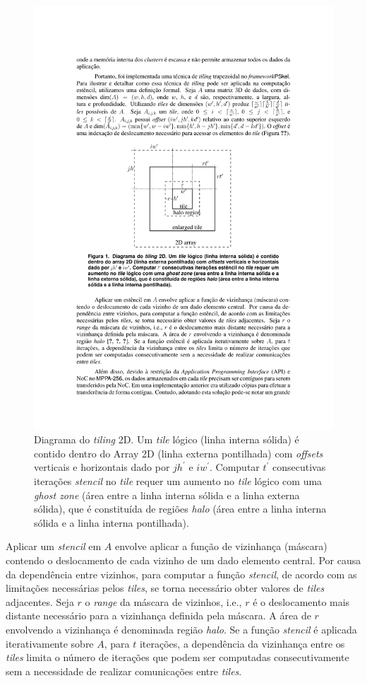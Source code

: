 \documentclass[12pt]{article}
\newcommand{\stencil}{\textit{stencil}\xspace}
\begin{document}
\begin{figure}[t]
\centering
\includegraphics[width=0.3\columnwidth]{figs/tile.pdf}
\caption{ Diagrama do \textit{tiling} 2D. Um \textit{tile} lógico (linha interna sólida) é contido dentro do Array
    2D (linha externa pontilhada) com \textit{offsets} verticais e horizontais dado por $j  h^\prime$
    e $i  w^\prime$. Computar $t^\prime$ consecutivas iterações \stencil no \textit{tile} requer um aumento no
    \textit{tile} lógico com uma \textit{ghost zone} (área entre a linha interna sólida e a linha externa sólida), que é constituída
    de regiões \textit{halo} (área entre a linha interna sólida e a linha interna pontilhada).}
\label{fig:gputile}
\end{figure}

Aplicar um \stencil em $A$ envolve aplicar a função de vizinhança (máscara)
contendo o deslocamento de cada vizinho de um dado elemento central. Por causa
da dependência entre vizinhos, para computar a função \stencil, de acordo com as
limitações necessárias pelos \textit{tiles}, se torna necessário obter valores
de \textit{tiles} adjacentes. Seja $r$ o \textit{range} da máscara de vizinhos,
i.e., $r$ é o deslocamento mais distante necessário para a vizinhança definida
pela máscara. A área de $r$ envolvendo a vizinhança é denominada região
\textit{halo}. Se a função \stencil é aplicada iterativamente sobre $A$, para
$t$ iterações, a dependência da vizinhança entre os \textit{tiles} limita o
número de iterações que podem ser computadas consecutivamente sem a necessidade
de realizar comunicações entre \textit{tiles}.
\end{document}
